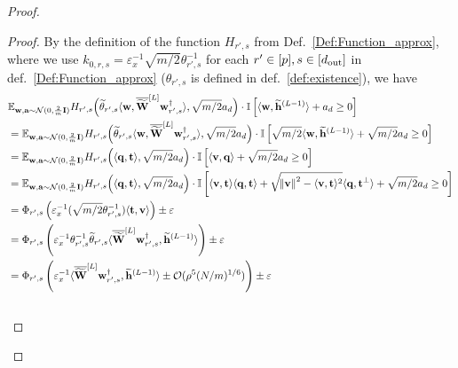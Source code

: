 \begin{claim}
\begin{proof}
\begin{proof}
					By the definition of the function $H_{r' ,s}$ from 
					Def.~\ref{Def:Function_approx}, where we use $k_{0, r, s} = \varepsilon_x^{-1} \sqrt{m/2} \theta_{r', s}^{-1}$  for each $r' \in [p], s \in [d_{\mathrm{out}} ]$ in def.~\ref{Def:Function_approx} ($\theta_{r' ,s}$ is defined in def.~\ref{def:existence}),
					we have
					\begingroup
					\allowdisplaybreaks
					\begin{align*}
						&\mathbb{E}_{\mathbf{w}, \mathbf{a} \sim \mathcal{N}(0, \frac{2}{m}\mathbf{I})}  H_{r', s}\Big(\widetilde{\theta}_{r', s} \langle \mathbf{w}, \overline{\widetilde{\mathbf{W}}}^{[L]} \mathbf{w}_{r', s}^{\dagger}\rangle , \sqrt{m/2} a_{d}\Big)  \cdot\mathbb{I} \left[ \langle \mathbf{w},  \widetilde{\mathbf{h}}^{(L-1)}\rangle + a_{d}  \ge 0 \right] \\&
						= \mathbb{E}_{\mathbf{w}, \mathbf{a} \sim \mathcal{N}(0, \frac{2}{m}\mathbf{I})}  H_{r', s}\Big(\widetilde{\theta}_{r', s} \langle \mathbf{w}, \overline{\widetilde{\mathbf{W}}}^{[L]} \mathbf{w}_{r', s}^{\dagger}\rangle , \sqrt{m/2} a_{d}\Big) \cdot\mathbb{I} \left[ \sqrt{m/2}\langle \mathbf{w},  \widetilde{\mathbf{h}}^{(L-1)}\rangle + \sqrt{m/2} a_{d}  \ge 0 \right] \\&
						= \mathbb{E}_{\mathbf{w}, \mathbf{a} \sim \mathcal{N}(0, \frac{2}{m}\mathbf{I})}  H_{r', s}\Big(  \langle \mathbf{q}, \mathbf{t}  \rangle, \sqrt{m/2} a_{d}\Big) \cdot \mathbb{I} \left[\langle \mathbf{v}, \mathbf{q} \rangle + \sqrt{m/2} a_{d}  \ge 0 \right] \\&
						= \mathbb{E}_{\mathbf{w}, \mathbf{a} \sim \mathcal{N}(0, \frac{2}{m}\mathbf{I})}  H_{r', s}\Big(  \langle \mathbf{q}, \mathbf{t}  \rangle, \sqrt{m/2} a_{d}\Big) \cdot  \mathbb{I} \left[\langle \mathbf{v}, \mathbf{t} \rangle \langle \mathbf{q}, \mathbf{t} \rangle +  \sqrt{\norm{\mathbf{v}}^2 - \langle \mathbf{v}, \mathbf{t} \rangle^2}  \langle \mathbf{q}, \mathbf{t}^{\perp} \rangle+ \sqrt{m/2} a_{d}  \ge 0 \right] \\&
						= \Phi_{r', s} \left(\varepsilon_x^{-1} (\sqrt{m/2}\theta_{r', s}^{-1}) \langle\mathbf{t}, \mathbf{v}\rangle\right) \pm \varepsilon 
						\\&
						= \Phi_{r', s} \left( \varepsilon_x^{-1} \theta_{r', s}^{-1} \widetilde{\theta}_{r', s} \langle \overline{\widetilde{\mathbf{W}}}^{[L]} \mathbf{w}_{r', s}^{\dagger}, \mathbf{\widetilde{h}}^{(L-1)} \rangle  \right) \pm \varepsilon \\&
						= \Phi_{r', s} \left( \varepsilon_x^{-1}  \langle \overline{\widetilde{\mathbf{W}}}^{[L]} \mathbf{w}_{r', s}^{\dagger}, \mathbf{\widetilde{h}}^{(L-1)}\rangle  \pm \mathcal{O}(\rho^5 (N/m)^{1/6})  \right) \pm \varepsilon \\&

\end{align*}
\end{proof}
\end{proof}
\end{claim}
